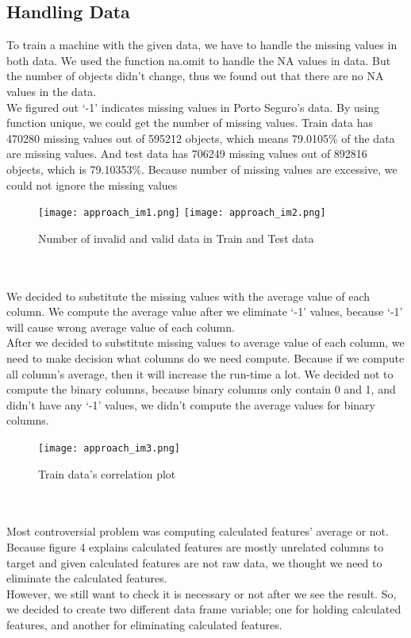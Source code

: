 \documentclass[fleqn,10pt]{SelfArx} %
\begin{document}
\subsection{Handling Data}
\hspace{\parindent} To train a  machine with the given data, we have to handle the missing values in both data. We used the function na.omit to handle the NA values in data. But the number of objects didn’t change, thus we found out that there are no NA values in the data. \\
We figured out ‘-1’ indicates missing values in Porto Seguro’s data. By using function unique, we could get the number of missing values. Train data has 470280 missing values out of 595212 objects, which means 79.0105$\%$ of the data are missing values. And test data has 706249 missing values out of 892816 objects, which is 79.10353$\%$. Because number of missing values are excessive, we could not ignore the missing values
\begin{figure}[h]
\texttt{[image: approach\_im1.png]}
\texttt{[image: approach\_im2.png]}
\caption{Number of invalid and valid data in Train and Test data}
\end{figure}
\\ \\
\hspace{\parindent} We decided to substitute the missing values with the average value of each column. We compute the average value after we eliminate ‘-1’ values, because ‘-1’ will cause wrong average value of each column. \\
After we decided to substitute missing values to average value of each column, we need to make decision what columns do we need compute. Because if we compute all column’s average, then it will increase the run-time a lot. We decided not to compute the binary columns, because binary columns only contain 0 and 1, and didn’t have any ‘-1’ values, we didn’t compute the average values for binary columns. 
\begin{figure}[h]
\texttt{[image: approach\_im3.png]}
\caption{Train data’s correlation plot}
\end{figure}
\\ \\

Most controversial problem was computing calculated features’ average or not. Because figure 4 explains calculated features are mostly unrelated columns to target and given calculated features are not raw data, we thought we need to eliminate the calculated features. \\
However, we still want to check it is necessary or not after we see the result. So, we decided to create two different data frame variable; one for holding calculated features, and another for eliminating calculated features. 
\end{document}
